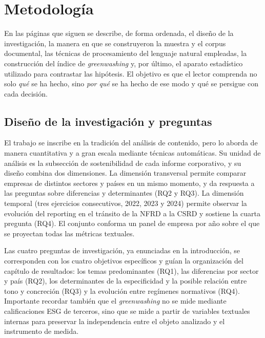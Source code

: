 \chapter{Metodología}
\label{cap:metodologia}

En las páginas que siguen se describe, de forma ordenada, el
diseño de la investigación, la manera en que se construyeron la muestra y el corpus documental,
las técnicas de procesamiento del lenguaje natural empleadas, la construcción del índice de \textit{greenwashing} y, por último, el
aparato estadístico utilizado para contrastar las hipótesis. El objetivo es que el lector
comprenda no solo \textit{qué} se ha hecho, sino \textit{por qué} se ha hecho de ese modo y qué
se persigue con cada decisión.

\section{Diseño de la investigación y preguntas}
\label{sec:diseno}

El trabajo se inscribe en la tradición del análisis de contenido, pero lo aborda de manera
cuantitativa y a gran escala mediante técnicas automáticas. Su unidad de análisis es la
subsección de sostenibilidad de cada informe corporativo, y su diseño combina dos dimensiones.
La dimensión transversal permite comparar empresas de distintos sectores y países en un mismo
momento, y da respuesta a las preguntas sobre diferencias y determinantes (RQ2 y RQ3). La
dimensión temporal (tres ejercicios consecutivos, 2022, 2023 y 2024) permite observar la
evolución del reporting en el tránsito de la NFRD a la CSRD y sostiene la cuarta pregunta
(RQ4). El conjunto conforma un panel de empresa por año sobre el que se proyectan todas las
métricas textuales.

Las cuatro preguntas de investigación, ya enunciadas en la introducción, se corresponden con
los cuatro objetivos específicos y guían la organización del capítulo de resultados: los temas
predominantes (RQ1), las diferencias por sector y país (RQ2), los determinantes de la
especificidad y la posible relación entre tono y concreción (RQ3) y la evolución entre
regímenes normativos (RQ4). Importante recordar también que el \textit{greenwashing} no se mide mediante 
calificaciones ESG de terceros, sino que
se mide a partir de variables textuales internas para preservar la independencia
entre el objeto analizado y el instrumento de medida.

